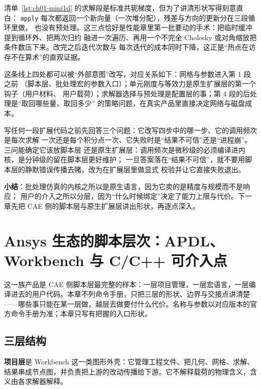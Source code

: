 \documentclass[12pt,a4paper,fontset=fandol]{ctexbook}
\newcommand{\Tp}[1]{\texttt{#1}}
\newcommand{\Lang}[1]{\textsf{#1}}
\newcommand{\DomCAE}{\Lang{CAE}}
\begin{document}
清单~\ref{lst:ch01-mini1d} 的求解段是标准共轭梯度，但为了讲清形状写得刻意直白：
\Tp{apply} 每次都返回一个新向量（一次堆分配），残差与方向的更新分在三段循环里做，
也没有预处理。这三点恰好是性能章里第一批要动的手术：把临时缓冲提到循环外、把两次归约
融进一次遍历、再用一个不完全 Cholesky 或对角缩放把条件数压下来。改完之后迭代次数与
每次迭代的成本同时下降，这正是``热点在访存不在算术''的直观证据。

这条线上四处都可以被``外部意图''改写，对应关系如下：网格与参数进入第 1 段之前
（脚本层、批处理宏的参数入口）；单元刚度与等效力是原生扩展层的第一个钩子（用户材料、
用户载荷）；求解器选择与预处理是配置层的事；第 4 段的后处理是``取回哪些量、取回多少''
的策略问题，在真实产品里直接决定网络与磁盘成本。

\begin{bestpractice}[title={扩展代码要沿这条线定位，不要贴着功能命名}]
写任何一段扩展代码之前先回答三个问题：它改写四步中的哪一步、它的调用频次是每次求解
一次还是每个积分点一次、它失败时是``结果不可信''还是``进程崩''。三问能确定它该放脚本层
还是原生扩展层：调用频次是微秒级的必须编译进内核，是分钟级的留在脚本层更好维护；
一旦答案落在``结果不可信''，就不要用脚本层的静默错误传播去赌，改为在扩展层里做显式
校验并让它直接失败退出。
\end{bestpractice}

\textbf{小结}：批处理仿真的内核之所以是原生语言，因为它卖的是精度与规模而不是响应；
用户的介入之所以分层，因为``什么时候绑定''决定了能力上限与代价。下一章先把
\DomCAE{} 侧的脚本层与原生扩展层讲出形状，再逐点深入。

\chapter{Ansys 生态的脚本层次：APDL、Workbench 与 C/C++ 可介入点}
\label{ch:ch02-ansys-layers}

这一族产品是 \DomCAE{} 侧脚本层最完整的样本：一层项目管理，一层宏语言，一层编译进去的用户代码。本章不列命令手册，只把三层的形状、边界与交接点讲清楚——哪些事只能在某一层做，越层去做要付什么代价。名称与参数以对应版本的官方命令手册为准；本章只写有把握的入口形状。

\section{三层结构}
\label{sec:ch02-three-layers}

\textbf{项目层}是 Workbench 这一类图形外壳：它管理工程文件、把几何、网格、求解、结果串成节点图，并负责把上游的改动传播给下游。它不解释载荷的物理含义，含义由各求解器解释。
\end{document}
